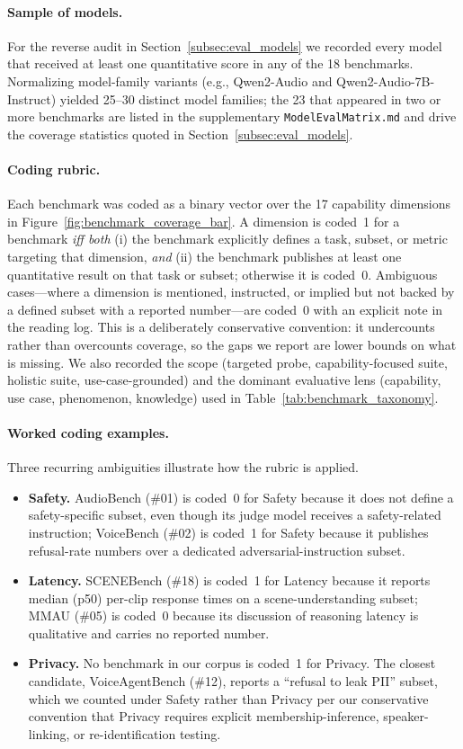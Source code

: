 \paragraph{Sample of models.}
For the reverse audit in Section~\ref{subsec:eval_models} we recorded
every model that received at least one quantitative score in any of
the 18 benchmarks. Normalizing model-family variants (e.g., Qwen2-Audio
and Qwen2-Audio-7B-Instruct) yielded 25--30 distinct model families;
the 23 that appeared in two or more benchmarks are listed in the
supplementary \texttt{ModelEvalMatrix.md} and drive the coverage
statistics quoted in Section~\ref{subsec:eval_models}.

\paragraph{Coding rubric.}
Each benchmark was coded as a binary vector over the 17 capability
dimensions in Figure~\ref{fig:benchmark_coverage_bar}. A dimension is
coded~1 for a benchmark \emph{iff both} (i) the benchmark explicitly
defines a task, subset, or metric targeting that dimension, \emph{and}
(ii) the benchmark publishes at least one quantitative result on that
task or subset; otherwise it is coded~0. Ambiguous cases---where a
dimension is mentioned, instructed, or implied but not backed by a
defined subset with a reported number---are coded~0 with an explicit
note in the reading log. This is a deliberately conservative
convention: it undercounts rather than overcounts coverage, so the
gaps we report are lower bounds on what is missing. We also recorded
the scope (targeted probe, capability-focused suite, holistic suite,
use-case-grounded) and the dominant evaluative lens (capability, use
case, phenomenon, knowledge) used in
Table~\ref{tab:benchmark_taxonomy}.

\paragraph{Worked coding examples.}
Three recurring ambiguities illustrate how the rubric is applied.
\begin{itemize}
  \item \textbf{Safety.} AudioBench (\#01) is coded~0 for Safety
  because it does not define a safety-specific subset, even though its
  judge model receives a safety-related instruction; VoiceBench
  (\#02) is coded~1 for Safety because it publishes refusal-rate
  numbers over a dedicated adversarial-instruction subset.
  \item \textbf{Latency.} SCENEBench (\#18) is coded~1 for Latency
  because it reports median (p50) per-clip response times on a
  scene-understanding subset; MMAU (\#05) is coded~0 because its
  discussion of reasoning latency is qualitative and carries no
  reported number.
  \item \textbf{Privacy.} No benchmark in our corpus is coded~1 for
  Privacy. The closest candidate, VoiceAgentBench (\#12), reports a
  ``refusal to leak PII'' subset, which we counted under Safety rather
  than Privacy per our conservative convention that Privacy requires
  explicit membership-inference, speaker-linking, or re-identification
  testing.
\end{itemize}

